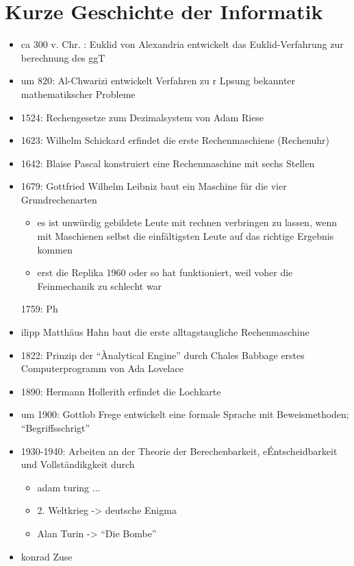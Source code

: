 \documentclass{gadsescript}
\begin{document}
\section{Kurze Geschichte der Informatik}
\begin{itemize}
	\item ca 300 v. Chr. : Euklid von Alexandria entwickelt das Euklid-Verfahrung zur berechnung des ggT
	\item 	um 820: Al-Chwarizi entwickelt Verfahren zu r Lpsung bekannter mathematikscher Probleme
	\item 	1524: Rechengesetze zum Dezimalsystem von Adam Riese
	\item 	1623: Wilhelm Schickard erfindet die erste Rechenmaschiene (Rechenuhr)
	\item 	1642: Blaise Pascal konstruiert eine Rechenmaschine mit sechs Stellen
	\item 	1679: Gottfried Wilhelm Leibniz baut ein Maschine für die vier Grundrechenarten
		\begin{itemize}
			\item es ist unwürdig gebildete Leute mit rechnen verbringen zu lassen, wenn mit Maschienen selbst die einfältigsten Leute auf das richtige Ergebnis kommen
			\item erst die Replika 1960 oder so hat funktioniert, weil voher die Feinmechanik zu schlecht war
		\end{itemize}
	1759: Ph\item ilipp Matthäus Hahn baut die erste alltagstaugliche Rechenmaschine
	\item 	1822: Prinzip der ``Ànalytical Engine'' durch Chales Babbage erstes Computerprogramm von Ada Lovelace
	\item 	1890: Hermann Hollerith erfindet die Lochkarte
	\item 	um 1900: Gottlob Frege entwickelt eine formale Sprache mit Beweismethoden; ``Begriffsschrigt''
	\item 	1930-1940: Arbeiten an der Theorie der Berechenbarkeit, eÉntscheidbarkeit und Vollständikgkeit durch
		\begin{itemize}
			\item adam turing ...
		\end{itemize}
		\begin{itemize}
			\item 2. Weltkrieg -> deutsche Enigma
			\item Alan Turin -> ``Die Bombe''
		\end{itemize}
	\item konrad Zuse

\end{itemize}
\end{document}
